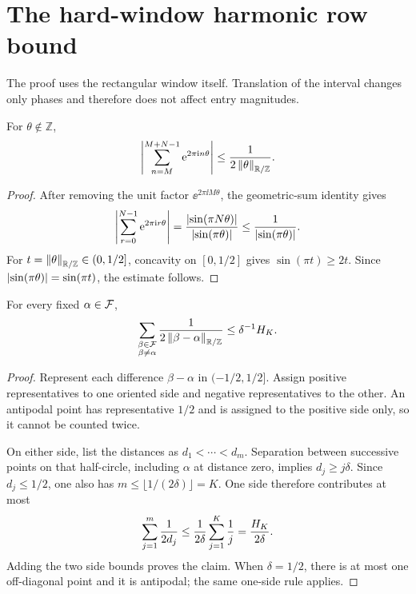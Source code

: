 \section{The hard-window harmonic row bound}\label{sec:row}

The proof uses the rectangular window itself.  Translation of the interval
changes only phases and therefore does not affect entry magnitudes.

\begin{lemma}\label{lem:geometric}
For $\theta\notin\mathbb Z$,
\[
\left\lvert \sum_{n=M}^{M+N-1}\mathrm{e}^{2\pi\mathrm{i} n\theta}\right\rvert
\leq\frac1{2\left\lVert \theta\right\rVert_{\mathbb{R}/\mathbb{Z}}}.
\]
\end{lemma}

\begin{proof}
After removing the unit factor $\ee^{2\pi\ii M\theta}$, the geometric-sum
identity gives
\[
\left\lvert \sum_{r=0}^{N-1}\mathrm{e}^{2\pi\mathrm{i} r\theta}\right\rvert
=\frac{\left\lvert \sin(\pi N\theta)\right\rvert}{\left\lvert \sin(\pi\theta)\right\rvert}
\leq\frac1{\left\lvert \sin(\pi\theta)\right\rvert}.
\]
For $t=\left\lVert \theta\right\rVert_{\mathbb{R}/\mathbb{Z}}\in(0,1/2]$, concavity on $[0,1/2]$ gives
$\sin(\pi t)\geq2t$.  Since
$\left\lvert \sin(\pi\theta)\right\rvert=\sin(\pi t)$, the estimate follows.
\end{proof}

\begin{lemma}\label{lem:packing}
For every fixed $\alpha\in\mathcal{F}$,
\[
\sum_{\substack{\beta\in\mathcal{F}\\\beta\neq\alpha}}
\frac1{2\left\lVert \beta-\alpha\right\rVert_{\mathbb{R}/\mathbb{Z}}}
\leq\delta^{-1}H_K.
\]
\end{lemma}

\begin{proof}
Represent each difference $\beta-\alpha$ in $(-1/2,1/2]$.  Assign positive
representatives to one oriented side and negative representatives to the
other.  An antipodal point has representative $1/2$ and is assigned to the
positive side only, so it cannot be counted twice.

On either side, list the distances as $d_1<\cdots<d_m$.  Separation between
successive points on that half-circle, including $\alpha$ at distance zero,
implies $d_j\geq j\delta$.  Since $d_j\leq1/2$, one also has
$m\leq\lfloor1/(2\delta)\rfloor=K$.  One side therefore contributes at most
\[
  \sum_{j=1}^{m}\frac1{2d_j}
  \leq\frac1{2\delta}\sum_{j=1}^{K}\frac1j
  =\frac{H_K}{2\delta}.
\]
Adding the two side bounds proves the claim.  When $\delta=1/2$, there is at
most one off-diagonal point and it is antipodal; the same one-side rule applies.
\end{proof}

